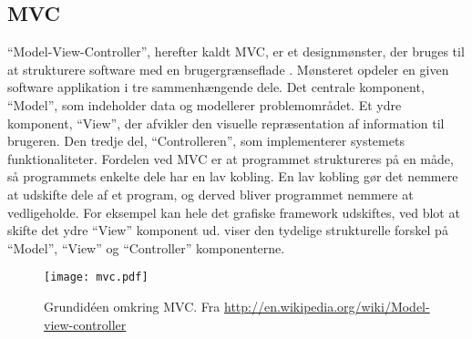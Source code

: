 \subsection{MVC}

\enquote{Model-View-Controller}, herefter kaldt MVC, er et designmønster, der bruges til at strukturere software med en brugergrænseflade \cite{mvcLecture}. Mønsteret opdeler en given software applikation i tre sammenhængende dele. Det centrale komponent, \enquote{Model}, som indeholder data og modellerer problemområdet. Et ydre komponent, \enquote{View}, der afvikler den visuelle repræsentation af information til brugeren. Den tredje del, \enquote{Controlleren}, som implementerer systemets funktionaliteter. Fordelen ved MVC er at programmet struktureres på en måde, så programmets enkelte dele har en lav kobling. En lav kobling gør det nemmere at udskifte dele af et program, og derved bliver programmet nemmere at vedligeholde. For eksempel kan hele det grafiske framework udskiftes, ved blot at skifte det ydre \enquote{View} komponent ud.  viser den tydelige strukturelle forskel på \enquote{Model}, \enquote{View} og \enquote{Controller} komponenterne.

\begin{figure}
  \centering
  \texttt{[image: mvc.pdf]}
  \caption{Grundidéen omkring MVC. Fra \url{http://en.wikipedia.org/wiki/Model-view-controller} } \label{fig:mvc}
\end{figure}
